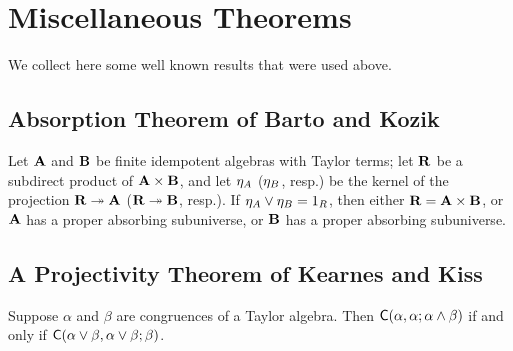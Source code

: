 \pagebreak




\appendix

\section{Miscellaneous Theorems}
We collect here some well known results that were used above.

\subsection{Absorption Theorem of Barto and Kozik}
\begin{theorem}
\label{thm:absorption}
Let $\mathbf{A}$ and $\mathbf{B}$ be finite
idempotent algebras with Taylor terms; let $\mathbf{R}$ be a subdirect product of
$\mathbf{A} \times \mathbf{B}$, and let $\eta_A$ ($\eta_B$, resp.) be the kernel of the
projection $\mathbf{R} \twoheadrightarrow \mathbf{A}$ ($\mathbf{R} \twoheadrightarrow \mathbf{B}$, resp.).
If $\eta_A \vee \eta_B = 1_R$, then either $\mathbf{R} = \mathbf{A} \times \mathbf{B}$, or
$\mathbf{A}$ has a proper absorbing subuniverse, or $\mathbf{B}$ has a proper absorbing subuniverse.
\end{theorem}

\subsection{A Projectivity Theorem of Kearnes and Kiss}
  \begin{theorem} 
    \label{thm:kearnes-kiss-3.27}
    Suppose $\alpha$ and $\beta$ are congruences of a Taylor algebra. Then
    $\mathsf{C}(\alpha,  \alpha;  \alpha \wedge \beta)$ if and only if
    $\mathsf{C}(\alpha \vee \beta,  \alpha \vee \beta;  \beta)$.
  \end{theorem}


